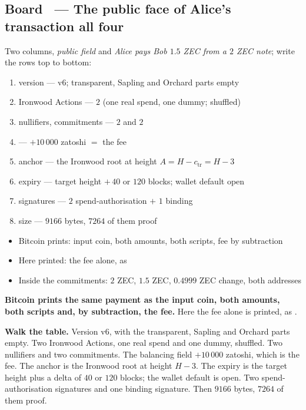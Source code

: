 \documentclass[11pt,a4paper]{article}
\makeatletter
\newcounter{board}
\newenvironment{board}[2]{\stepcounter{board}%
  \subsection*{Board \theboard\ --- #1 \hfill {\normalfont\small\color{arb}#2}}}{\medskip}
\newcommand{\Draw}{\draw@head{Draw}}
\newcommand{\Write}{\draw@head{Write}}
\newcommand{\Say}{\draw@head{Say}}
\makeatother
\begin{document}
\begin{board}{The public face of Alice's transaction}{all four}
\Draw
Two columns, \emph{public field} and \emph{Alice pays Bob $1.5$ ZEC from
a $2$ ZEC note}; write the rows top to bottom:
\begin{enumerate}
  \item version --- v6; transparent, Sapling and Orchard parts empty
  \item Ironwood Actions --- $2$ (one real spend, one dummy; shuffled)
  \item nullifiers, commitments --- $2$ and $2$
  \item \wbHvbi{} --- $+10\,000$ zatoshi $=$ the fee
  \item anchor --- the Ironwood root at height $A = H - c_{\mathrm{tr}} =
    H - 3$
  \item expiry --- target height $+\,40$ or $120$ blocks; wallet default
    open
  \item signatures --- $2$ spend-authorisation $+$ $1$ binding
  \item size --- $9166$ bytes, $7264$ of them proof
\end{enumerate}
\Write
\begin{itemize}
  \item Bitcoin prints: input coin, both amounts, both scripts, fee by
    subtraction
  \item Here printed: the fee alone, as \wbHvbi
  \item Inside the commitments: $2$ ZEC, $1.5$ ZEC, $0.4999$ ZEC change,
    both addresses
\end{itemize}
\Say
\textbf{Bitcoin prints the same payment as the input coin, both amounts,
both scripts and, by subtraction, the fee.} Here the fee alone is
printed, as \wbHvbi.

\textbf{Walk the table.} Version v6, with the transparent, Sapling and
Orchard parts empty. Two Ironwood Actions, one real spend and one dummy,
shuffled. Two nullifiers and two commitments. The balancing field
$+10\,000$ zatoshi, which is the fee. The anchor is the Ironwood root at
height $H - 3$. The expiry is the target height plus a delta of $40$ or
$120$ blocks; the wallet default is open. Two spend-authorisation signatures
and one binding signature. Then $9166$ bytes, $7264$ of them proof.


\end{board}
\end{document}
